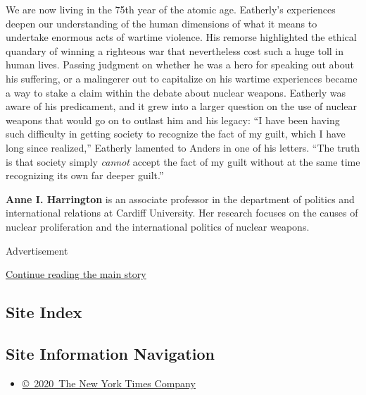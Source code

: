 We are now living in the 75th year of the atomic age. Eatherly's
experiences deepen our understanding of the human dimensions of what it
means to undertake enormous acts of wartime violence. His remorse
highlighted the ethical quandary of winning a righteous war that
nevertheless cost such a huge toll in human lives. Passing judgment on
whether he was a hero for speaking out about his suffering, or a
malingerer out to capitalize on his wartime experiences became a way to
stake a claim within the debate about nuclear weapons. Eatherly was
aware of his predicament, and it grew into a larger question on the use
of nuclear weapons that would go on to outlast him and his legacy: ``I
have been having such difficulty in getting society to recognize the
fact of my guilt, which I have long since realized,'' Eatherly lamented
to Anders in one of his letters. ``The truth is that society simply
\emph{cannot} accept the fact of my guilt without at the same time
recognizing its own far deeper guilt.''

\textbf{Anne I. Harrington} is an associate professor in the department
of politics and international relations at Cardiff University. Her
research focuses on the causes of nuclear proliferation and the
international politics of nuclear weapons.

Advertisement

\protect\hyperlink{after-bottom}{Continue reading the main story}

\hypertarget{site-index}{%
\subsection{Site Index}\label{site-index}}

\hypertarget{site-information-navigation}{%
\subsection{Site Information
Navigation}\label{site-information-navigation}}

\begin{itemize}
\tightlist
\item
  \href{https://help.nytimes.com/hc/en-us/articles/115014792127-Copyright-notice}{©~2020~The
  New York Times Company}
\end{itemize}

